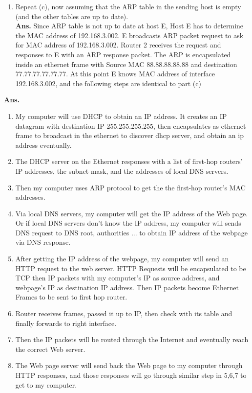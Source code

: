 \documentclass[11pt]{article}
\newenvironment{problem}[2][Problem]{\begin{trivlist}
\item[\hskip \labelsep {\bfseries #1}\hskip \labelsep {\bfseries #2.}]}{\end{trivlist}}
\begin{document}
\begin{enumerate}
\begin{enumerate}
	\end{enumerate}
	
	\item[d. ]
	Repeat (c), now assuming that the ARP table in the sending host is empty (and the
	other tables are up to date).
	\\
	\textbf{Ans. } 
	Since ARP table is not up to date at host E, 
	Host E has to determine the MAC address of 192.168.3.002. 
	E broadcasts ARP packet request to ask for MAC address of 192.168.3.002. 
	Router 2 receives the request and responses to E with an ARP response packet. 
	The ARP is encapsulated inside an ethernet frame with Source MAC 88.88.88.88.88 and destination 77.77.77.77.77.77. 
	At this point E knows MAC address of interface 192.168.3.002, 
	and the following steps are identical to part (c) 
\end{enumerate}


\begin{problem}{2}
\end{problem}
\textbf{Ans. }
\begin{enumerate}
	\item 
	My computer will use DHCP to obtain an IP address. It creates an IP datagram with destination IP 255.255.255.255, then encapsulates as ethernet frame to broadcast in the ethernet to discover dhcp server, and obtain an ip address eventually. 
	\item 
	The DHCP server on the Ethernet responses with a list of first-hop routers’ IP addresses,
	the subnet mask, and the addresses of local DNS servers.

	\item 
	Then my computer uses ARP protocol to get the the first-hop router’s MAC addresses.

	\item 
	Via local DNS servers, my computer will get the IP address of the Web page. Or if local DNS servers don't know the IP address, my computer will sends DNS request to DNS root, authorities ... to obtain IP address of the webpage via DNS response.

	\item 
	After getting the IP address of the webpage, my computer will send an HTTP request to the web server. 
	HTTP Requests will be encapsulated to be TCP then IP packets with my computer's IP as source address, and webpage's IP as destination IP address.
	Then IP packets become Ethernet Frames to be sent to first hop router. 

	\item 
	Router receives frames, passed it up to IP, then check with its table and finally forwards to right interface.

	\item 
	Then the IP packets will be routed through the Internet and eventually reach the correct Web server.

	\item 
	The Web page server will send back the Web page to my computer through HTTP responses, and those responses will go through similar step in 5,6,7 to get to my computer.
	
\end{enumerate}
\end{document}
